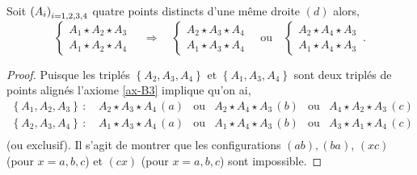 \begin{cor}\label{cor-configurationuncote}
    Soit $\left(A_{i}\right)_{i = 1,2,3,4}$ quatre points distincts d'une même droite $(d)$ alors,
    \begin{equation*}
        \left\{
        \begin{array}{cc}
             A_1 \star A_2 \star A_3  \\
             A_1 \star A_2 \star A_4 
        \end{array}
        \right. \quad \Longrightarrow \quad       
        \left\{\begin{array}{cc}
             A_2 \star A_3 \star A_4  \\
             A_1 \star A_3 \star A_4 
        \end{array}\right. \quad \text{ou} \quad
        \left\{\begin{array}{cc}
             A_2 \star A_4 \star A_3  \\
             A_1 \star A_4 \star A_3 
        \end{array}\right.\,.
    \end{equation*}
    \begin{proof}
        Puisque les triplés $\left\{A_2,A_3,A_4\right\}$ et $\left\{A_1,A_3,A_4\right\}$ sont deux triplés de points alignés l'axiome \ref{ax-B3} implique qu'on ai,
        \begin{equation*}
            \begin{array}{cccccc}
                 \left\{A_1,A_2,A_3\right\}\,:\,& A_2 \star A_3 \star A_4 \,(a) & \text{ou} & A_2 \star A_4 \star A_3 \,(b) & \text{ou} & A_4 \star A_2 \star A_3 \,(c) \\
                 \left\{A_2,A_3,A_4\right\}\,:\,& A_1 \star A_3 \star A_4 \,(a) & \text{ou} & A_1 \star A_4 \star A_3 \,(b) & \text{ou} & A_3 \star A_1 \star A_4 \,(c) \\
            \end{array}
        \end{equation*}
        (ou exclusif). Il s'agit de montrer que les configurations $(ab),(ba)$, $(xc)$ (pour $x=a,b,c$) et $(cx)$ (pour $x=a,b,c$) sont impossible.


\end{proof}
\end{cor}
